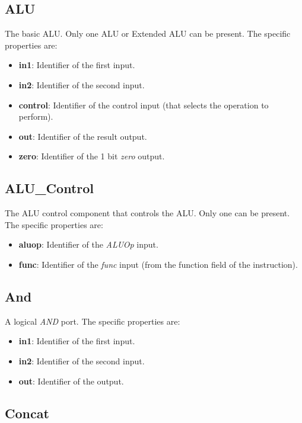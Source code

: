 \documentclass[11pt,a4paper,twoside,titlepage]{report}
\begin{document}
\subsection{ALU}

The basic ALU. Only one ALU or Extended ALU can be present. The specific properties are:
\begin{itemize}
	\item \textbf{in1}: Identifier of the first input.
	\item \textbf{in2}: Identifier of the second input.
	\item \textbf{control}: Identifier of the control input (that selects the operation
		to perform).
	\item \textbf{out}: Identifier of the result output.
	\item \textbf{zero}: Identifier of the 1 bit \emph{zero} output.
\end{itemize}

\subsection{ALU\_Control}

The ALU control component that controls the ALU. Only one can be present.
The specific properties are:
\begin{itemize}
	\item \textbf{aluop}: Identifier of the \textit{ALUOp} input.
	\item \textbf{func}: Identifier of the \emph{func} input (from the function field
		of the instruction).
\end{itemize}

\subsection{And}

A logical \emph{AND} port. The specific properties are:
\begin{itemize}
	\item \textbf{in1}: Identifier of the first input.
	\item \textbf{in2}: Identifier of the second input.
	\item \textbf{out}: Identifier of the output.
\end{itemize}

\subsection{Concat}
\end{document}
